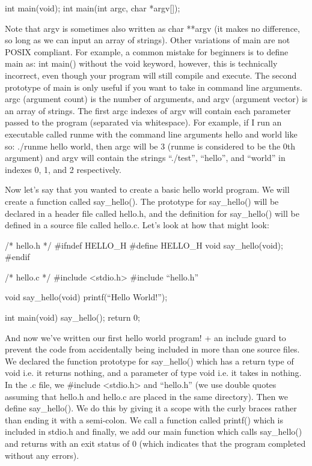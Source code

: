 \documentclass{article}
\begin{document}
\begin{cblk}
int main(void);
int main(int argc, char *argv[]);
\end{cblk}

Note that argv is sometimes also written as char **argv (it makes no difference, so long as we can input an
array of strings). Other variations of main are not POSIX compliant. For example, a common mistake for
beginners is to define main as: int main() {} without the void keyword, however, this is technically
incorrect, even though your program will still compile and execute. The second prototype of main is only
useful if you want to take in command line arguments. argc (argument count) is the number of arguments, and
argv (argument vector) is an array of strings. The first argc indexes of argv will contain each parameter
passed to the program (separated via whitespace). For example, if I run an executable called runme with the
command line arguments hello and world like so: ./runme hello world, then argc will be 3 (runme is considered
to be the 0th argument) and argv will contain the strings “./test”, “hello”, and “world” in indexes 0, 1, and
2 respectively.

Now let’s say that you wanted to create a basic hello world program. We will create a function called
say_hello(). The prototype for say_hello() will be declared in a header file called hello.h, and the
definition for say_hello() will be defined in a source file called hello.c. Let’s look at how that might
look:

\begin{cblk}
/* hello.h */
#ifndef HELLO_H
#define HELLO_H
void say_hello(void);
#endif

/* hello.c */
#include <stdio.h>
#include “hello.h”

void say_hello(void) {
	printf(“Hello World!\n”);
}

int main(void) {
	say_hello();
	return 0;
}
\end{cblk}

And now we’ve written our first hello world program! + an include guard to prevent the code from accidentally
being included in more than one source files. We declared the function prototype for say_hello() which has a
return type of void i.e. it returns nothing, and a parameter of type void i.e. it takes in nothing. In the .c
file, we #include <stdio.h> and “hello.h” (we use double quotes assuming that hello.h and hello.c are placed
in the same directory). Then we define say_hello(). We do this by giving it a scope with the curly braces
rather than ending it with a semi-colon. We call a function called printf() which is included in stdio.h and
finally, we add our main function which calls say_hello() and returns with an exit status of 0 (which
indicates that the program completed without any errors).
\end{document}
